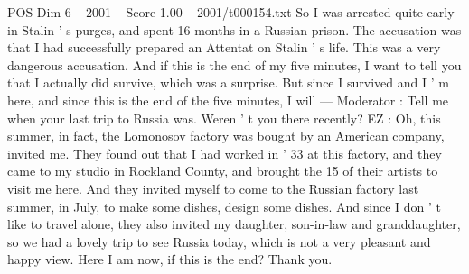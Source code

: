 \begin{textsample}{POS Dim 6 – 2001 – Score 1.00 – 2001/t000154.txt}
So I was arrested quite early in Stalin ' s purges, and spent 16 months in a Russian prison.
The accusation was that I had successfully prepared an Attentat on Stalin ' s life.
This was a very dangerous accusation.
And if this is the end of my five minutes, I want to tell you that I actually did survive, which was a surprise.
But since I survived and I ' m here, and since this is the end of the five minutes, I will — Moderator : Tell me when your last trip to Russia was.
Weren ' t you there recently?
EZ : Oh, this summer, in fact, the Lomonosov factory was bought by an American company, invited me.
They found out that I had worked in ' 33 at this factory, and they came to my studio in Rockland County, and brought the 15 of their artists to visit me here.
And they invited myself to come to the Russian factory last summer, in July, to make some dishes, design some dishes.
And since I don ' t like to travel alone, they also invited my daughter, son-in-law and granddaughter, so we had a lovely trip to see Russia today, which is not a very pleasant and happy view.
Here I am now, if this is the end?
Thank you.

\end{textsample}
